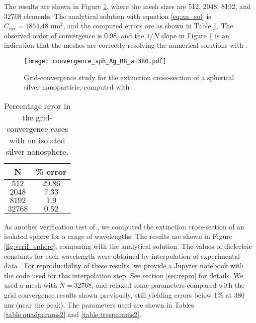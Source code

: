 The results are shown in Figure \ref{fig:error_sphere_Ag}, where the mesh sizes are
512, 2048, 8192, and 32768 elements. 
The analytical solution with equation \eqref{eq:an_sol} is $C_{ext} = 1854.48$ nm$^2$, 
and the computed errors are as shown in Table \ref{table:err_iso_sphere}.
The observed order of convergence is $0.98$, and the $1/N$ slope in Figure \ref{fig:error_sphere_Ag}
is an indication that the meshes are correctly resolving the numerical solutions with \pygbe. 


\begin{figure}[h] %
   \centering
   \texttt{[image: convergence\_sph\_Ag\_R8\_w=380.pdf]} 
   \caption{Grid-convergence study for the extinction cross-section of a spherical silver
            nanoparticle, computed with \pygbe.}
   \label{fig:error_sphere_Ag}
\end{figure}



\begin{table}[h]
    \centering
    \caption{\label{table:err_iso_sphere} Percentage error in the grid-convergence cases with an isolated silver nanosphere.} 
    \begin{tabular}{c c}
    \hline%
    N & \% error \\
    \hline%
     $512$ & $29.86$ \\
     $2048$ & $7.33$ \\
     $8192$ & $1.9$ \\
     $32768$ & $0.52$ \\
    \hline%
    \end{tabular}
\end{table}

As another verification test of \pygbe, we computed the extinction cross-section of an 
isolated sphere for a range of wavelengths. 
The results are shown in Figure \ref{fig:verif_sphere}, comparing with the analytical solution. 
The values of dielectric constants for each wavelength were obtained by interpolation of 
experimental data \cite{JohnsonChristy1972, HaleQuerry1972}.
For reproducibility of these results, we provide a Jupyter notebook with the code used for this interpolation step.
See section \ref{sec:repro} for details.
We used a mesh with $N=32768$, and relaxed some parameters compared with the grid convergence results shown previously, still yielding errors below $1\%$ at 380 nm (near the peak).
The parameters used are shown in Tables \ref{table:quadparams2} and \ref{table:treeparams2}.



